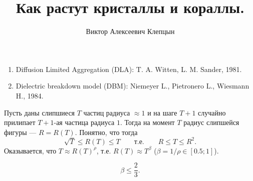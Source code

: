 \documentclass[12pt,a4paper]{article}
\title{Как растут кристаллы и кораллы.}
\author{Виктор Алексеевич Клепцын}
\begin{document}
    \maketitle

    \begin{enumerate}
        \item Diffusion Limited Aggregation (DLA): T. A. Witten, L. M. Sander, 1981.
        \item Dielectric breakdown model (DBM): Niemeyer L., Pietronero L., Wiesmann H., 1984.
    \end{enumerate}

    Пусть даны слипшиеся $T$ частиц радиуса $\approx 1$ и на шаге $T+1$ случайно прилипает $T+1$-ая частица радиуса $1$. Тогда на момент $T$ радиус слипшейся фигуры --- $R = R(T)$. Понятно, что тогда
    \[\sqrt{T} \leqslant R(T) \leqslant T \qquad \text{т.е.} \qquad R \leqslant T \leqslant R^2.\]
    Оказывается, что $T \approx R(T)^\rho$, т.е. $R(T) \approx T^\beta$ ($\beta = 1/\rho \in [0.5; 1]$).

    \begin{theorem}
        \[\beta \leqslant \frac{2}{3}.\]
    \end{theorem}

    
\end{document}
